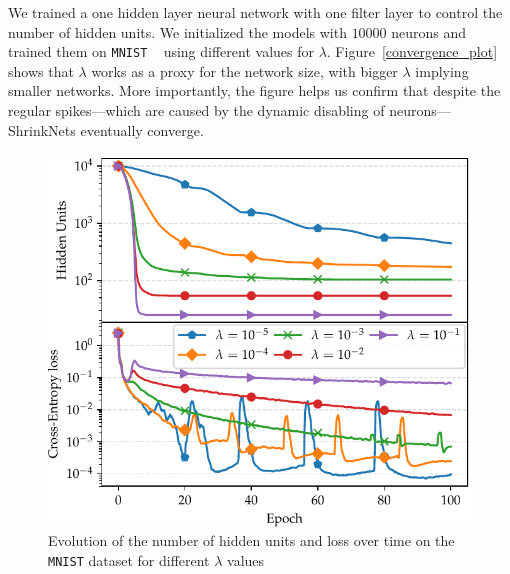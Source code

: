 \documentclass[sigconf]{acmart}
\newcommand{\gl}[1]{\textcolor{violet}{{\bf Gl:} #1}}
\begin{document}
We trained a one hidden layer
neural network with one filter layer to control the number of hidden units. We
initialized the models with $10000$ neurons and trained them on \texttt{MNIST}
~\cite{Lecun1998} using different values for $\lambda$.
Figure~\autoref{convergence_plot} shows that
$\lambda$ works as a proxy for the network size,
with bigger $\lambda$ implying smaller
networks. More importantly, the figure helps us confirm that despite the regular
spikes---which are caused by the dynamic disabling of neurons---ShrinkNets
eventually converge.

\begin{figure}
\vspace{-.2in}
\begin{center}
\includegraphics[width=\columnwidth]{convergence}
\vspace{-.2in}
\caption{Evolution of the number of hidden units and loss over time on the \texttt{MNIST} dataset for different $\lambda$ values \label{convergence_plot}}
\vspace{-.2in}
\end{center}
\end{figure}
\end{document}
